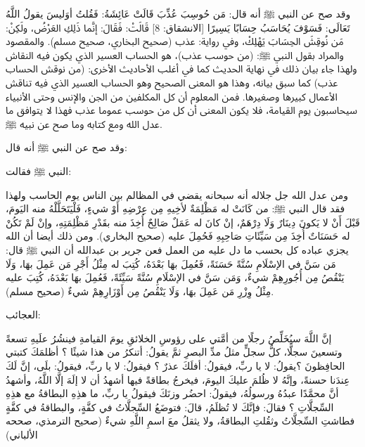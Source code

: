 وقد صح عن النبي ﷺ أنه قال: مَن حُوسِبَ عُذِّبَ قَالَتْ عَائِشَةُ: فَقُلتُ أوَليسَ يقولُ اللَّهُ تَعَالَى: {فَسَوْفَ يُحَاسَبُ حِسَابًا يَسِيرًا} [الانشقاق: 8] قَالَتْ: فَقَالَ: إنَّما ذَلِكِ العَرْضُ، ولَكِنْ: مَن نُوقِشَ الحِسَابَ يَهْلِكْ، وفي رواية: عذب {\footnotesize (صحيح البخاري، صحيح مسلم)}. والمقصود والمراد بقول النبي ﷺ: (من حوسب عذب)،  هو الحساب العسير الذي يكون فيه النقاش ولهذا جاء بيان ذلك في نهاية الحديث كما في أغلب الأحاديث الأخرى: (من نوقش الحساب عذب) كما سبق بيانه، وهذا هو المعنى الصحيح وهو الحساب العسير الذي فيه تناقش الأعمال كبيرها وصغيرها. فمن المعلوم أن كل المكلفين من الجن والإنس وحتى الأنبياء سيحاسبون يوم القيامة، فلا يكون المعنى أن كل من حوسب عموما عذب فهذا لا يتوافق ما عدل الله ومع كتابه وما صح عن نبيه ﷺ. 

وقد صح عن النبي ﷺ أنه قال: 

النبي ﷺ فقالت: 










ومن عدل الله جل جلاله أنه سبحانه يقضي في المظالم بين الناس يوم الحاسب ولهذا فقد قال النبي ﷺ:  من كَانَتْ له مَظْلِمَةٌ لأخِيهِ مِن عِرْضِهِ أَوْ شيءٍ، فَلْيَتَحَلَّلْهُ منه اليَومَ، قَبْلَ أَنْ لا يَكونَ دِينَارٌ وَلَا دِرْهَمٌ، إنْ كانَ له عَمَلٌ صَالِحٌ أُخِذَ منه بقَدْرِ مَظْلِمَتِهِ، وإنْ لَمْ تَكُنْ له حَسَنَاتٌ أُخِذَ مِن سَيِّئَاتِ صَاحِبِهِ فَحُمِلَ عليه {\footnotesize (صحيح البخاري)}. ومن ذلك أيضا أن الله يجزي عباده كل بحسب ما دل عليه من العمل فعن جرير بن عبدالله أن النبي ﷺ قال: مَن سَنَّ في الإسْلَامِ سُنَّةً حَسَنَةً، فَعُمِلَ بهَا بَعْدَهُ، كُتِبَ له مِثْلُ أَجْرِ مَن عَمِلَ بهَا، وَلَا يَنْقُصُ مِن أُجُورِهِمْ شيءٌ، وَمَن سَنَّ في الإسْلَامِ سُنَّةً سَيِّئَةً، فَعُمِلَ بهَا بَعْدَهُ، كُتِبَ عليه مِثْلُ وِزْرِ مَن عَمِلَ بهَا، وَلَا يَنْقُصُ مِن أَوْزَارِهِمْ شيءٌ {\footnotesize (صحيح مسلم)}.

العجائب: 

إنَّ اللَّهَ سيُخَلِّصُ رجلًا من أمَّتي على رؤوسِ الخلائقِ يومَ القيامةِ فينشُرُ علَيهِ تسعةً وتسعينَ سجلًّا، كلُّ سجلٍّ مثلُ مدِّ البصرِ ثمَّ يقولُ: أتنكرُ من هذا شيئًا ؟ أظلمَكَ كتبتي الحافِظونَ ؟يقولُ: لا يا ربِّ، فيقولُ: أفلَكَ عذرٌ ؟ فيقولُ: لا يا ربِّ، فيقولُ: بلَى، إنَّ لَكَ عِندَنا حسنةً، وإنَّهُ لا ظُلمَ عليكَ اليومَ، فيخرجُ بطاقةً فيها أشهدُ أن لا إلَهَ إلَّا اللَّهُ، وأشهدُ أنَّ محمَّدًا عبدُهُ ورسولُهُ، فيقولُ: احضُر وزنَكَ فيقولُ يا ربِّ، ما هذِهِ البطاقةُ مع هذِهِ السِّجلَّاتِ ؟ فقالَ: فإنَّكَ لا تُظلَمُ، قالَ: فتوضَعُ السِّجلَّاتُ في كفَّةٍ، والبطاقةُ في كفَّةٍ فطاشتِ السِّجلَّاتُ وثقُلتِ البطاقةُ، ولا يثقلُ معَ اسمِ اللَّهِ شيءٌ {\footnotesize (صحيح الترمذي، صححه الألباني)}


